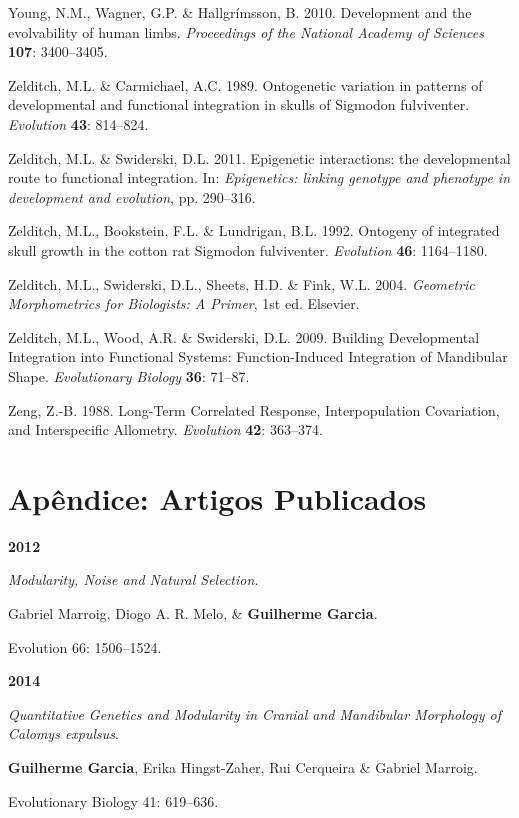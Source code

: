 \documentclass[12pt,twoside]{report}
\begin{document}
Young, N.M., Wagner, G.P. \& Hallgrímsson, B. 2010. Development and the
evolvability of human limbs. \emph{Proceedings of the National Academy
of Sciences} \textbf{107}: 3400--3405.

Zelditch, M.L. \& Carmichael, A.C. 1989. Ontogenetic variation in
patterns of developmental and functional integration in skulls of
Sigmodon fulviventer. \emph{Evolution} \textbf{43}: 814--824.

Zelditch, M.L. \& Swiderski, D.L. 2011. Epigenetic interactions: the
developmental route to functional integration. In: \emph{Epigenetics:
linking genotype and phenotype in development and evolution}, pp.
290--316.

Zelditch, M.L., Bookstein, F.L. \& Lundrigan, B.L. 1992. Ontogeny of
integrated skull growth in the cotton rat Sigmodon fulviventer.
\emph{Evolution} \textbf{46}: 1164--1180.

Zelditch, M.L., Swiderski, D.L., Sheets, H.D. \& Fink, W.L. 2004.
\emph{Geometric Morphometrics for Biologists: A Primer}, 1st ed.
Elsevier.

Zelditch, M.L., Wood, A.R. \& Swiderski, D.L. 2009. Building
Developmental Integration into Functional Systems: Function-Induced
Integration of Mandibular Shape. \emph{Evolutionary Biology}
\textbf{36}: 71--87.

Zeng, Z.-B. 1988. Long-Term Correlated Response, Interpopulation
Covariation, and Interspecific Allometry. \emph{Evolution} \textbf{42}:
363--374.

\chapter*{Apêndice: Artigos Publicados}

\textbf {2012}

\textit {Modularity, Noise and Natural Selection.}

Gabriel Marroig, Diogo A. R. Melo, \& \textbf {Guilherme Garcia}.  

Evolution 66: 1506–1524.

\vspace {0.3 cm}

\textbf{2014}

\textit{Quantitative Genetics and Modularity in Cranial and Mandibular Morphology of \emph{Calomys expulsus}}.

\textbf {Guilherme Garcia}, Erika Hingst-Zaher, Rui Cerqueira \& Gabriel Marroig.

Evolutionary Biology 41: 619–636.
\end{document}
